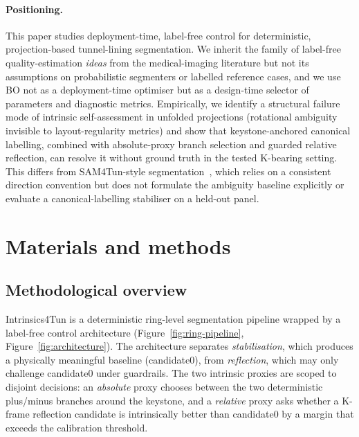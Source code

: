 \documentclass[a4paper,fleqn]{cas-dc}
\begin{document}
\paragraph{Positioning.} This paper studies deployment-time, label-free control for deterministic, projection-based tunnel-lining segmentation. We inherit the family of label-free quality-estimation \emph{ideas} from the medical-imaging literature but not its assumptions on probabilistic segmenters or labelled reference cases, and we use BO not as a deployment-time optimiser but as a design-time selector of parameters and diagnostic metrics. Empirically, we identify a structural failure mode of intrinsic self-assessment in unfolded projections (rotational ambiguity invisible to layout-regularity metrics) and show that keystone-anchored canonical labelling, combined with absolute-proxy branch selection and guarded relative reflection, can resolve it without ground truth in the tested K-bearing setting. This differs from SAM4Tun-style segmentation~\cite{ye2025sam4tun}, which relies on a consistent direction convention but does not formulate the ambiguity baseline explicitly or evaluate a canonical-labelling stabiliser on a held-out panel.


\section{Materials and methods}\label{sec:methods}

\subsection{Methodological overview}

Intrinsics4Tun is a deterministic ring-level segmentation pipeline wrapped by a label-free control architecture (Figure~\ref{fig:ring-pipeline}, Figure~\ref{fig:architecture}). The architecture separates \emph{stabilisation}, which produces a physically meaningful baseline (candidate0), from \emph{reflection}, which may only challenge candidate0 under guardrails. The two intrinsic proxies are scoped to disjoint decisions: an \emph{absolute} proxy chooses between the two deterministic plus/minus branches around the keystone, and a \emph{relative} proxy asks whether a K-frame reflection candidate is intrinsically better than candidate0 by a margin that exceeds the calibration threshold.
\end{document}
